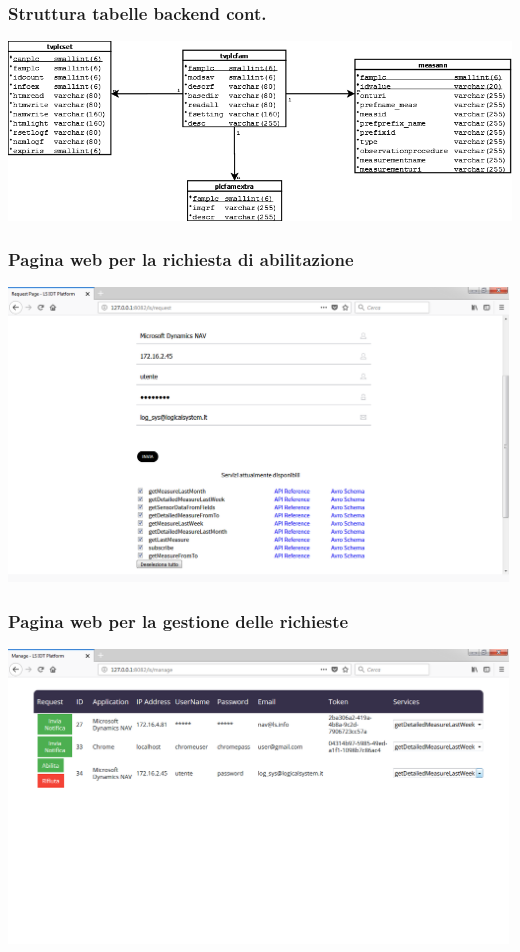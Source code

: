 \documentclass{beamer}
\begin{document}
\begin{frame}
\frametitle{Struttura tabelle backend cont.}
\includegraphics[width=1\textwidth]{images/tabelle-ontologia.png}
\end{frame}

\begin{frame}
\frametitle{Pagina web per la richiesta di abilitazione}
\includegraphics[width=1\textwidth]{images/RequestPagePlatform.png}
\end{frame}

\begin{frame}
\frametitle{Pagina web per la gestione delle richieste}
\includegraphics[width=1\textwidth]{images/managePagePlatform.png}
\end{frame}
\end{document}
